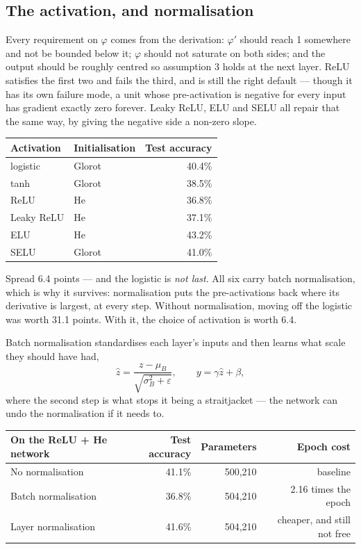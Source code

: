 \documentclass[11pt,a4paper]{article}
\begin{document}
\subsection{The activation, and normalisation}

Every requirement on $\varphi$ comes from the derivation: $\varphi'$ should
reach 1 somewhere and not be bounded below it; $\varphi$ should not saturate on
both sides; and the output should be roughly centred so assumption 3 holds at
the next layer. ReLU satisfies the first two and fails the third, and is still
the right default --- though it has its own failure mode, a unit whose
pre-activation is negative for every input has gradient exactly zero forever.
Leaky ReLU, ELU and SELU all repair that the same way, by giving the negative
side a non-zero slope.

\begin{center}
\small
\begin{tabular}{llr}
\toprule
\textbf{Activation} & \textbf{Initialisation} & \textbf{Test accuracy} \\
\midrule
logistic & Glorot & 40.4\% \\
tanh & Glorot & 38.5\% \\
ReLU & He & 36.8\% \\
Leaky ReLU & He & 37.1\% \\
ELU & He & 43.2\% \\
SELU & Glorot & 41.0\% \\
\bottomrule
\end{tabular}
\end{center}

Spread 6.4 points --- and the logistic is \emph{not last}. All six carry batch
normalisation, which is why it survives: normalisation puts the pre-activations
back where its derivative is largest, at every step. Without normalisation,
moving off the logistic was worth 31.1 points. With it, the choice of
activation is worth 6.4.

Batch normalisation standardises each layer's inputs and then learns what scale
they should have had,
\[ \hat z = \frac{z - \mu_B}{\sqrt{\sigma_B^2 + \varepsilon}},
   \qquad y = \gamma\hat z + \beta, \]
where the second step is what stops it being a straitjacket --- the network can
undo the normalisation if it needs to.

\begin{center}
\small
\begin{tabular}{lrrr}
\toprule
\textbf{On the ReLU + He network} & \textbf{Test accuracy} &
\textbf{Parameters} & \textbf{Epoch cost} \\
\midrule
No normalisation & 41.1\% & 500{,}210 & baseline \\
Batch normalisation & 36.8\% & 504{,}210 & 2.16 times the epoch \\
Layer normalisation & 41.6\% & 504{,}210 & cheaper, and still not free \\
\bottomrule
\end{tabular}
\end{center}
\end{document}
